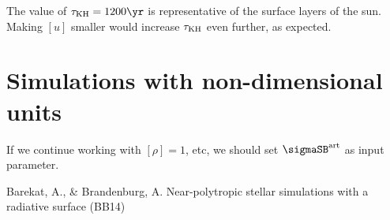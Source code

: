 \documentclass[twocolumn]{article}
\begin{document}
The value of $\tau_{\rm KH}=1200\yr$ is representative of the
surface layers of the sun.
Making $[u]$ smaller would increase $\tau_{\rm KH}$ even further,
as expected.

\section{Simulations with non-dimensional units}

If we continue working with $[\rho]=1$, etc, we should set
$\sigmaSB^{\rm art}$ as input parameter.




\begin{thebibliography}{}

Barekat, A., \& Brandenburg, A.
{Near-polytropic stellar simulations with a radiative surface}
(BB14)

\end{thebibliography}

\end{document}
